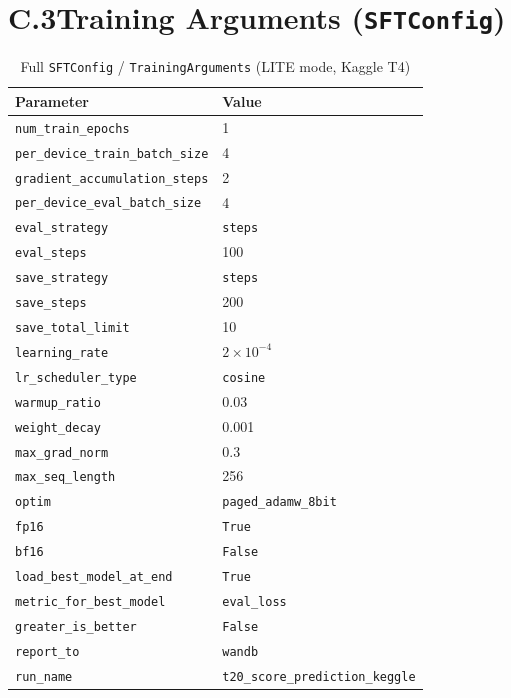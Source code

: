 \section*{C.3\quad Training Arguments (\texttt{SFTConfig})}

\begin{table}[ht]
\centering
\caption{Full \texttt{SFTConfig} / \texttt{TrainingArguments} (LITE mode, Kaggle T4)}
\label{tab:training_args_full}
\begin{tabular}{ll}
\hline
\textbf{Parameter} & \textbf{Value} \\
\hline
\texttt{num\_train\_epochs}          & 1 \\
\texttt{per\_device\_train\_batch\_size} & 4 \\
\texttt{gradient\_accumulation\_steps} & 2 \\
\texttt{per\_device\_eval\_batch\_size} & 4 \\
\texttt{eval\_strategy}             & \texttt{steps} \\
\texttt{eval\_steps}                & 100 \\
\texttt{save\_strategy}             & \texttt{steps} \\
\texttt{save\_steps}                & 200 \\
\texttt{save\_total\_limit}         & 10 \\
\texttt{learning\_rate}             & $2 \times 10^{-4}$ \\
\texttt{lr\_scheduler\_type}        & \texttt{cosine} \\
\texttt{warmup\_ratio}              & 0.03 \\
\texttt{weight\_decay}              & 0.001 \\
\texttt{max\_grad\_norm}            & 0.3 \\
\texttt{max\_seq\_length}           & 256 \\
\texttt{optim}                      & \texttt{paged\_adamw\_8bit} \\
\texttt{fp16}                       & \texttt{True} \\
\texttt{bf16}                       & \texttt{False} \\
\texttt{load\_best\_model\_at\_end} & \texttt{True} \\
\texttt{metric\_for\_best\_model}   & \texttt{eval\_loss} \\
\texttt{greater\_is\_better}        & \texttt{False} \\
\texttt{report\_to}                 & \texttt{wandb} \\
\texttt{run\_name}                  & \texttt{t20\_score\_prediction\_keggle} \\
\hline
\end{tabular}
\end{table}

